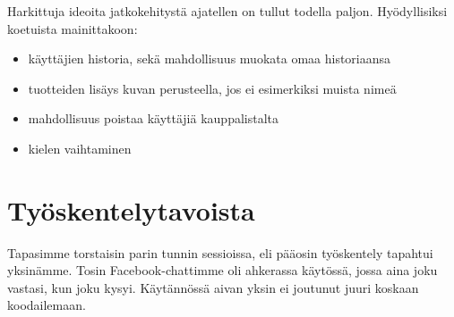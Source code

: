 \documentclass[12pt,a4paper]{article}
\begin{document}
\pagebreak

Harkittuja ideoita jatkokehitystä ajatellen on tullut todella paljon. Hyödyllisiksi koetuista mainittakoon:
\begin{itemize}
    \item käyttäjien historia, sekä mahdollisuus muokata omaa historiaansa
    \item tuotteiden lisäys kuvan perusteella, jos ei esimerkiksi muista nimeä
    \item mahdollisuus poistaa käyttäjiä kauppalistalta
    \item kielen vaihtaminen
\end{itemize}

\section*{Työskentelytavoista}
Tapasimme torstaisin parin tunnin sessioissa, eli pääosin työskentely tapahtui yksinämme. Tosin Facebook-chattimme oli ahkerassa käytössä, jossa aina joku vastasi, kun joku kysyi. Käytännössä aivan yksin ei joutunut juuri koskaan koodailemaan.
\end{document}
